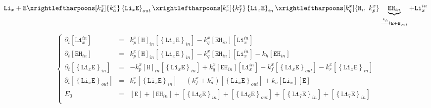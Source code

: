 \documentclass[aps,onecolumn,12pt]{revtex4}
\newcommand{\mychem}[1]{\mathtt{#1}}
\newcommand{\myconc}[1]{\left\lbrack{#1}\right\rbrack}
\newcommand{\LiEin}[1]{\myconc{\left\lbrace\mychem{Li}_{#1}\mychem{E}\right\rbrace_{in}}}
\newcommand{\LiEout}[1]{\myconc{\left\lbrace\mychem{Li}_{#1}\mychem{E}\right\rbrace_{out}}}
\newcommand{\LiIn}[1]{\myconc{\mychem{Li}_{#1}^{in}}}
\newcommand{\LiOut}[1]{\myconc{\mychem{Li}_{#1}}}
\newcommand{\EHin}{\myconc{\mychem{EH}_{in}}}
\newcommand{\Eout}{\myconc{\mychem{E}}}
\begin{document}
\begin{equation}
	 \mychem{Li}_{x} +  \mychem{E}  
	 \xrightleftharpoons[k_d^x]{k_a^x} 
	 \left\lbrace\mychem{Li}_{x}\mychem{E}\right\rbrace_{out} 
	  \xrightleftharpoons[k_r^x]{k_f^x} 
	  \left\lbrace\mychem{Li}_{x}\mychem{E}\right\rbrace_{in}  
	  \xrightleftharpoons[k_q^x]{\mychem{H}_i,\;k_p^x} \underbrace{\mychem{EH}_{in}}_{\xrightarrow[]{k_h} \mychem{E} + \mychem{H}_{out}} + \mychem{Li}_{x}^{in}
\end{equation}

\begin{equation}
\left\lbrace
\begin{array}{rcl}
\partial_t\LiIn{x} & = & k_p^x \myconc{\mychem{H}}_{in} \LiEin{x} - k_q^x \EHin \LiIn{x} \\
\partial_t \EHin & = & k_p^x \myconc{\mychem{H}}_{in} \LiEin{x} - k_q^x \EHin \LiIn{x} - k_h \EHin \\
\partial_t \LiEin{x} & = & -k_p^x \myconc{\mychem{H}}_{in} \LiEin{x} + k_q^x \EHin \LiIn{x}
+ k_f^x \LiEout{x} - k_r^x \LiEin{x}\\
\partial_t \LiEout{x} & = & k_r^x \LiEin{x} - (k_f^x+k_d^x) \LiEout{x} + k_a \LiOut{x} \Eout \\
E_0 & = & \Eout + \EHin + \LiEin{6} + \LiEout{6} + \LiEin{7}+\LiEin{7}\\
\end{array}
\right.
\end{equation}
\end{document}
